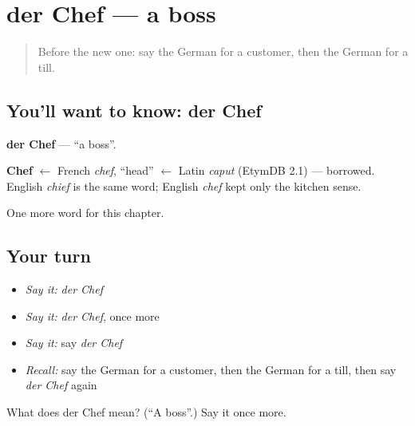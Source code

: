 \section[der Chef]{der Chef — a boss}

\label{lesson:GE-C126-chef}



\begin{quote}
Before the new one: say the German for a customer, then the German for a till.
\end{quote}

\subsection*{You'll want to know: der Chef}
\textbf{der Chef} — \textquotedblleft{}a boss\textquotedblright{}.

\begin{cousinweb}
\textbf{Chef} $\leftarrow$ French \emph{chef}, \textquotedblleft{}head\textquotedblright{} $\leftarrow$ Latin \emph{caput} (EtymDB 2.1) — borrowed. English \emph{chief} is the same word; English \emph{chef} kept only the kitchen sense.
\end{cousinweb}

\begin{grammarlens}[title={What you've built}]
One more word for this chapter.
\end{grammarlens}

\subsection*{Your turn}
\begin{itemize}
\raggedright
  \item \emph{Say it:} \emph{der Chef}
  \item \emph{Say it:} \emph{der Chef}, once more
  \item \emph{Say it:} say \emph{der Chef}
  \item \emph{Recall:} say the German for a customer, then the German for a till, then say \emph{der Chef} again
\end{itemize}

\begin{tcolorbox}[breakable,colback=teal!4,colframe=teal!35!black,title={Before you move on}]
What does der Chef mean? (\textquotedblleft{}A boss\textquotedblright{}.) Say it once more.
\end{tcolorbox}
